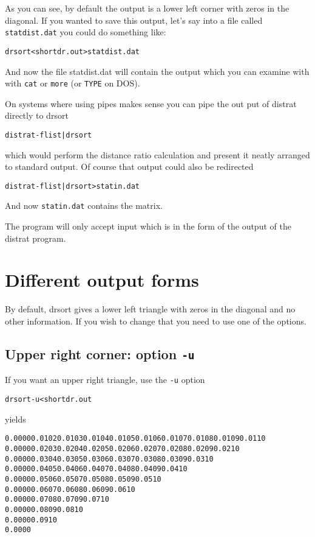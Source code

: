\documentclass[%
	11pt,
        a4paper,
        twoside]{workrep}
\newcommand*{\prg}[1]{\textsf{#1}}		%
\newcommand*{\cmd}[1]{\texttt{#1}}		%
\newcommand*{\file}[1]{\texttt{#1}}		%
\newcommand*{\opt}[1]{\texttt{#1}}		%
\begin{document}
As you can see, by default the output is a lower left corner with
zeros in the diagonal.  If you wanted to save this output, let's
say into a file called \file{statdist.dat} you could do something like:
\begin{alltt}
  drsort < shortdr.out > statdist.dat
\end{alltt}
And now the file statdist.dat will contain the output which
you can examine with with \cmd{cat} or \cmd{more} (or \cmd{TYPE}
on DOS).

On systems where using pipes makes sense you can pipe the
out put of \prg{distrat} directly to \prg{drsort}
\begin{alltt}
 distrat -f list | drsort
\end{alltt}
which would perform the distance ratio calculation and present it neatly
arranged to standard output.  Of course that output could also be redirected

\begin{alltt}
  distrat -f list | drsort > statin.dat
\end{alltt}
And now \file{statin.dat} contains the matrix.

The program will only accept input which is in the form of the
output of the \prg{distrat} program.

\section{Different output forms}

By default, \prg{drsort} gives a lower left triangle with zeros in the
diagonal and no other information.  If you wish to change that
you need to use one of the options.

\subsection{Upper right corner: option \opt{-u}}

If you want an upper right triangle, use the \opt{-u} option

\begin{alltt}
 drsort -u < shortdr.out
\end{alltt}
yields
\begin{alltt}\small
 0.0000 0.0102 0.0103 0.0104 0.0105 0.0106 0.0107 0.0108 0.0109 0.0110
        0.0000 0.0203 0.0204 0.0205 0.0206 0.0207 0.0208 0.0209 0.0210
               0.0000 0.0304 0.0305 0.0306 0.0307 0.0308 0.0309 0.0310
                      0.0000 0.0405 0.0406 0.0407 0.0408 0.0409 0.0410
                             0.0000 0.0506 0.0507 0.0508 0.0509 0.0510
                                    0.0000 0.0607 0.0608 0.0609 0.0610
                                           0.0000 0.0708 0.0709 0.0710
                                                  0.0000 0.0809 0.0810
                                                         0.0000 0.0910
                                                                0.0000
\end{alltt}
\end{document}
